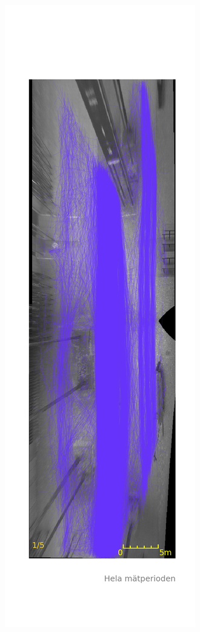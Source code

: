 \documentclass{article}
\begin{document}
\begin{figure}[H]
\centering
\begin{subfigure}{.3\textwidth}
  \centering
  \includegraphics[width=\linewidth]{data/Data_2.png}

\end{subfigure}
\end{figure}
\end{document}
